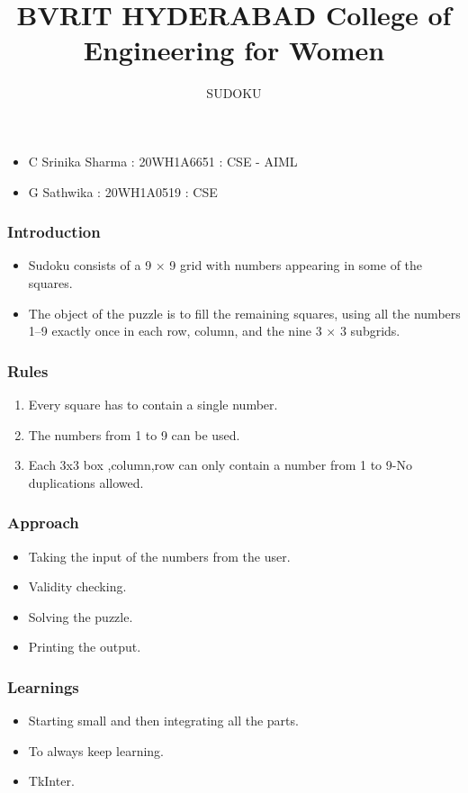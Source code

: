 \documentclass[14pt]{beamer}
\title{BVRIT HYDERABAD College of Engineering for Women}
\subtitle{SUDOKU}
\begin{document}
 \begin{frame}
        \titlepage
    \end{frame}
\begin{frame}
 \begin{itemize}
       \item C Srinika Sharma : 20WH1A6651 : CSE - AIML
       \item G Sathwika : 20WH1A0519 : CSE
   \end{itemize}
\end{frame}
   \begin{frame}
	\frametitle{Introduction}
        \begin{itemize}
	    \item Sudoku consists of a 9 × 9 grid with numbers appearing in some of the squares.
              \item The object of the puzzle is to fill the remaining squares, using all the numbers 1–9 exactly once in each row, column, and the nine 3 × 3 subgrids.
	\end{itemize}
   \end{frame}
   \begin{frame}
	\frametitle{Rules}
         \begin{enumerate}
	    \item Every square has to contain a single number.
	    \item The numbers from 1 to 9 can be used.
	     \item Each 3x3 box ,column,row can only contain a number from 1 to 9-No duplications allowed.
	\end{enumerate}
  \end{frame}
\begin{frame}
   \frametitle{Approach}
   \begin{itemize}
       \item Taking the input of the numbers from the user.
       \item Validity checking. 
       \item Solving the puzzle. 
       \item Printing the output.
   \end{itemize}
\end{frame}
 \begin{frame}
  \frametitle{Learnings}
  \begin{itemize}
      \item Starting small and then integrating all the parts.
      \item To always keep learning.
      \item TkInter. 
   \end{itemize}
\end{frame}
\end{document}
